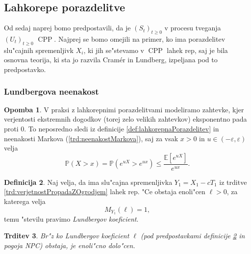 \documentclass[12pt, a4paper, reqno]{amsart}
\theoremstyle{definition}
\newtheorem{definicija}{Definicija}[section]
\newtheorem{opomba}[definicija]{Opomba}
\theoremstyle{plain}
\newtheorem{trditev}[definicija]{Trditev}
\newcommand{\E}{\mathbb{E}}
\newcommand{\Prob}{\mathbb{P}}
\newcommand{\1}{\mathds{1}}
\DeclareMathOperator{\CPP}{CPP}
\begin{document}
    \subsection{Lahkorepe porazdelitve}
        Od sedaj naprej bomo predpostavili, da je $(S_t)_{t\geq0}$ v procesu tveganja $(U_t)_{t\geq0}$ $\CPP$.
        Najprej se bomo omejili na primer, ko ima porazdelitev slu"cajnih spremenljivk $X_i$, ki jih 
        se"stevamo v $\CPP$ lahek rep, saj je bila osnovna teorija, ki sta jo razvila Cramér in Lundberg,
        izpeljana pod to predpostavko.
        \subsubsection{Lundbergova neenakost}

            \begin{opomba}
                V praksi z lahkorepnimi porazdelitvami modeliramo zahtevke, kjer verjentosti ekstremnih 
                dogodkov (torej zelo velikih zahtevkov) eksponentno pada proti $0$. To neposredno sledi iz 
                definicije \ref{def:lahkorepnaPorazdelitev} in neenakosti Markova (\ref{trd:neenakostMarkova}), 
                saj za vsak 
                $x>0$ in $u\in(-\varepsilon, \varepsilon)$ velja
                \begin{equation*}
                    \Prob\left(X > x\right) = \Prob\left(e^{uX} > e^{ux}\right) \leq \frac{\E\left[e^{uX}\right]}{e^{ux}}.
                \end{equation*}
                \label{op:lahkorepnaPorazdelitev}
            \end{opomba}

            \begin{definicija}
                Naj velja, da ima slu"cajna spremenljivka $Y_1 = X_1 - cT_1$ iz trditve \ref{trd:verjetnostPropadaZOgrodjem} 
                lahek rep. "Ce obstaja enoli"cen $\ell > 0$, za katerega velja
                \begin{equation*}
                    M_{Y_1}(\ell)  = 1,
                \end{equation*}
                temu "stevilu pravimo \textit{Lundbergov koeficient}.
                \label{def:LundbergovKoeficient}
            \end{definicija}

            \begin{trditev}
                Br"z ko Lundbergov koeficient $\ell$ (pod predpostavkami definicije \ref{def:LundbergovKoeficient} in 
                pogoja NPC)
                obstaja, je enoli"cno dolo"cen.
                \label{trd:enolicnostLundbergovegaKoeficienta}
            \end{trditev}
\end{document}
